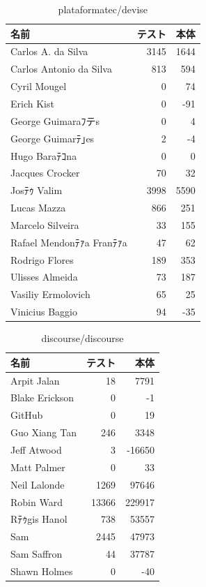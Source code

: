 \begin{table}[htb]
\begin{center}
\caption{plataformatec/devise}
\begin{tabular}{|l|r|r|} \hline 
名前 & テスト & 本体 \\ \hline \hline
Carlos A. da Silva & 3145 & 1644\\ \hline
Carlos Antonio da Silva & 813 & 594\\ \hline
Cyril Mougel & 0 & 74\\ \hline
Erich Kist & 0 & -91\\ \hline
George Guimaraﾌテs & 0 & 4\\ \hline
George Guimarﾃ｣es & 2 & -4\\ \hline
Hugo Baraﾃｺna & 0 & 0\\ \hline
Jacques Crocker & 70 & 32\\ \hline
Josﾃｩ Valim & 3998 & 5590\\ \hline
Lucas Mazza & 866 & 251\\ \hline
Marcelo Silveira & 33 & 155\\ \hline
Rafael Mendonﾃｧa Franﾃｧa & 47 & 62\\ \hline
Rodrigo Flores & 189 & 353\\ \hline
Ulisses Almeida & 73 & 187\\ \hline
Vasiliy Ermolovich & 65 & 25\\ \hline
Vinicius Baggio & 94 & -35\\ \hline
\end{tabular}
\end{center}
\end{table}

\begin{table}[htb]
\begin{center}
\caption{discourse/discourse}
\begin{tabular}{|l|r|r|} \hline 
名前 & テスト & 本体 \\ \hline \hline
Arpit Jalan & 18 & 7791\\ \hline
Blake Erickson & 0 & -1\\ \hline
GitHub & 0 & 19\\ \hline
Guo Xiang Tan & 246 & 3348\\ \hline
Jeff Atwood & 3 & -16650\\ \hline
Matt Palmer & 0 & 33\\ \hline
Neil Lalonde & 1269 & 97646\\ \hline
Robin Ward & 13366 & 229917\\ \hline
Rﾃｩgis Hanol & 738 & 53557\\ \hline
Sam & 2445 & 47973\\ \hline
Sam Saffron & 44 & 37787\\ \hline
Shawn Holmes & 0 & -40\\ \hline
\end{tabular}
\end{center}
\end{table}

